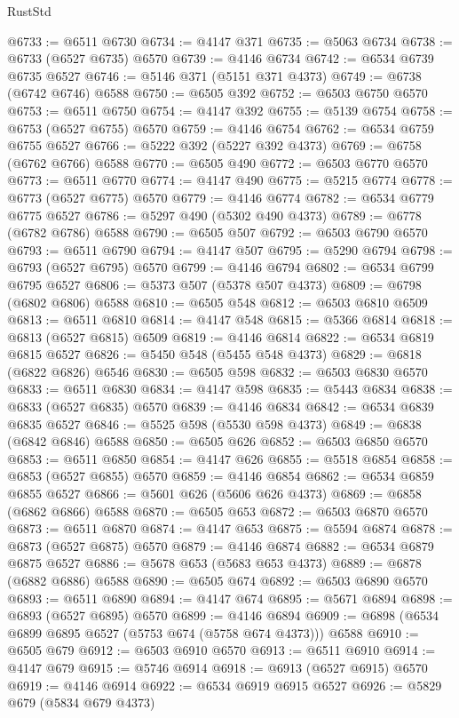 \begin{lexlean}{RustStd}
\begin{coremodule}
@6733 := @6511 @6730
@6734 := @4147 @371
@6735 := @5063 @6734
@6738 := @6733 (@6527 @6735) @6570
@6739 := @4146 @6734
@6742 := @6534 @6739 @6735 @6527
@6746 := @5146 @371 (@5151 @371 @4373)
@6749 := @6738 (@6742 @6746) @6588
@6750 := @6505 @392
@6752 := @6503 @6750 @6570
@6753 := @6511 @6750
@6754 := @4147 @392
@6755 := @5139 @6754
@6758 := @6753 (@6527 @6755) @6570
@6759 := @4146 @6754
@6762 := @6534 @6759 @6755 @6527
@6766 := @5222 @392 (@5227 @392 @4373)
@6769 := @6758 (@6762 @6766) @6588
@6770 := @6505 @490
@6772 := @6503 @6770 @6570
@6773 := @6511 @6770
@6774 := @4147 @490
@6775 := @5215 @6774
@6778 := @6773 (@6527 @6775) @6570
@6779 := @4146 @6774
@6782 := @6534 @6779 @6775 @6527
@6786 := @5297 @490 (@5302 @490 @4373)
@6789 := @6778 (@6782 @6786) @6588
@6790 := @6505 @507
@6792 := @6503 @6790 @6570
@6793 := @6511 @6790
@6794 := @4147 @507
@6795 := @5290 @6794
@6798 := @6793 (@6527 @6795) @6570
@6799 := @4146 @6794
@6802 := @6534 @6799 @6795 @6527
@6806 := @5373 @507 (@5378 @507 @4373)
@6809 := @6798 (@6802 @6806) @6588
@6810 := @6505 @548
@6812 := @6503 @6810 @6509
@6813 := @6511 @6810
@6814 := @4147 @548
@6815 := @5366 @6814
@6818 := @6813 (@6527 @6815) @6509
@6819 := @4146 @6814
@6822 := @6534 @6819 @6815 @6527
@6826 := @5450 @548 (@5455 @548 @4373)
@6829 := @6818 (@6822 @6826) @6546
@6830 := @6505 @598
@6832 := @6503 @6830 @6570
@6833 := @6511 @6830
@6834 := @4147 @598
@6835 := @5443 @6834
@6838 := @6833 (@6527 @6835) @6570
@6839 := @4146 @6834
@6842 := @6534 @6839 @6835 @6527
@6846 := @5525 @598 (@5530 @598 @4373)
@6849 := @6838 (@6842 @6846) @6588
@6850 := @6505 @626
@6852 := @6503 @6850 @6570
@6853 := @6511 @6850
@6854 := @4147 @626
@6855 := @5518 @6854
@6858 := @6853 (@6527 @6855) @6570
@6859 := @4146 @6854
@6862 := @6534 @6859 @6855 @6527
@6866 := @5601 @626 (@5606 @626 @4373)
@6869 := @6858 (@6862 @6866) @6588
@6870 := @6505 @653
@6872 := @6503 @6870 @6570
@6873 := @6511 @6870
@6874 := @4147 @653
@6875 := @5594 @6874
@6878 := @6873 (@6527 @6875) @6570
@6879 := @4146 @6874
@6882 := @6534 @6879 @6875 @6527
@6886 := @5678 @653 (@5683 @653 @4373)
@6889 := @6878 (@6882 @6886) @6588
@6890 := @6505 @674
@6892 := @6503 @6890 @6570
@6893 := @6511 @6890
@6894 := @4147 @674
@6895 := @5671 @6894
@6898 := @6893 (@6527 @6895) @6570
@6899 := @4146 @6894
@6909 := @6898 (@6534 @6899 @6895 @6527 (@5753 @674 (@5758 @674 @4373))) @6588
@6910 := @6505 @679
@6912 := @6503 @6910 @6570
@6913 := @6511 @6910
@6914 := @4147 @679
@6915 := @5746 @6914
@6918 := @6913 (@6527 @6915) @6570
@6919 := @4146 @6914
@6922 := @6534 @6919 @6915 @6527
@6926 := @5829 @679 (@5834 @679 @4373)

\end{coremodule}
\end{lexlean}
